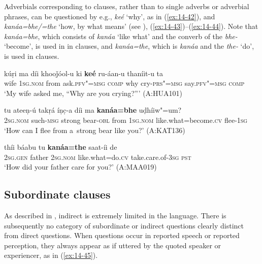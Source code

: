 Adverbials corresponding to clauses, rather than to single adverbs or adverbial phrases, can be questioned by e.g., \textit{keé} `why', as in (\ref{ex:14-42}), and \textit{kanáa=bhe/=the} `how, by what means' (see ), (\ref{ex:14-43})--(\ref{ex:14-44}). Note that \textit{kanáa=bhe}, which consists of \textit{kanáa} `like what' and the converb of the  \textit{bhe-} `become', is used in in clauses, and \textit{kanáa=the}, which is \textit{kanáa} and the  \textit{the-} `do', is used in  clauses.

\begin{exe}
\ex
\label{ex:14-42}
\gll kúṛi ma díi khooǰóol-u ki \textbf{keé} ru-áan-u thaníit-u ta\\
wife \textsc{1sg.nom} from ask.\textsc{pfv"=msg} \textsc{comp} why  cry-\textsc{prs"=msg} say.\textsc{pfv"=msg} \textsc{comp}\\
\glt `My wife asked me, ``Why are you crying?''' (A:HUA101)

\ex
\label{ex:14-43}
\gll tu ateeṇ-ú takṛá íṇc̣-a díi ma \textbf{kanáa=bhe} uḍhíiw"=um? \\
\textsc{2sg.nom} such-\textsc{msg} strong bear-\textsc{obl} from \textsc{1sg.nom}  like.what=become.\textsc{cv} flee-\textsc{1sg} \\
\glt `How can I flee from a~strong bear like you?' (A:KAT136)

\ex
\label{ex:14-44}
\gll thíi báabu tu \textbf{kanáa=the} saat-íi de \\
\textsc{2sg.gen} father \textsc{2sg.nom} like.what=do.\textsc{cv} take.care.of-\textsc{3sg} \textsc{pst} \\
\glt `How did your father care for you?' (A:MAA019)
\end{exe}

\subsection{Subordinate  clauses}
\label{subsec:14-2-3}


As described in , indirect  is extremely limited in the language. There is subsequently no category of subordinate or indirect questions clearly distinct from direct questions. When questions occur in reported speech or reported perception, they always appear as if uttered by the quoted speaker or experiencer, as in (\ref{ex:14-45}).

